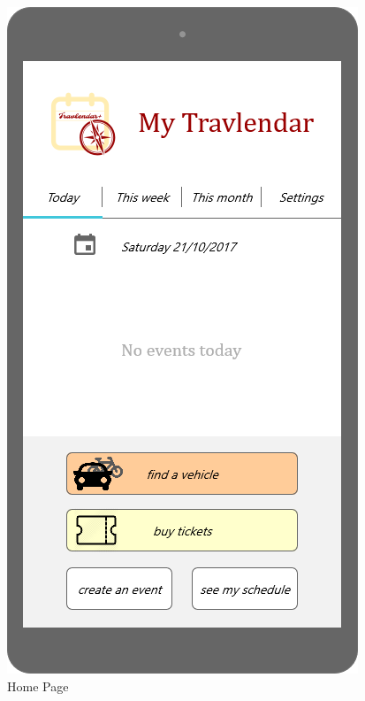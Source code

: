\documentclass{article}
\begin{document}
\begin{figure}[H]
  \includegraphics[width=\linewidth]{01-Home_Page.png}
  \caption{Home Page}\label{fig:MU4}
\endminipage\hfill
{}

\end{figure}
\end{document}
